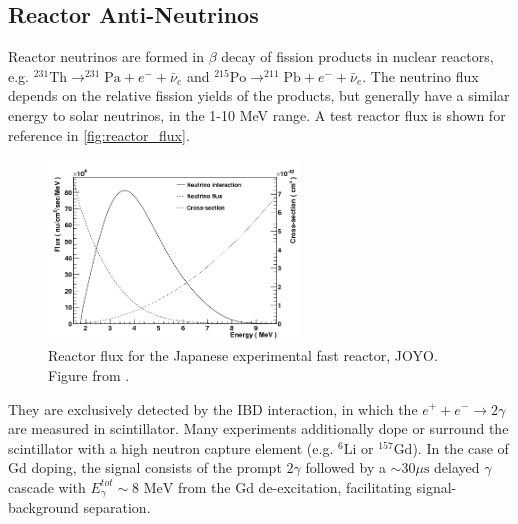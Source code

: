 \subsection{Reactor Anti-Neutrinos}
Reactor neutrinos are formed in $\beta$ decay of fission products in nuclear reactors, e.g. $^{231}\text{Th} \rightarrow ^{231}\text{Pa} + e^- + \bar{\nu}_e$ and $^{215}\text{Po} \rightarrow ^{211}\text{Pb} + e^- + \bar{\nu}_e$. The neutrino flux depends on the relative fission yields of the products, but generally have a similar energy to solar neutrinos, in the 1-10 MeV range. A test reactor flux is shown for reference in \autoref{fig:reactor_flux}.
\begin{figure}[h]
	\includegraphics[width=0.6\textwidth, trim={0mm 0mm 0mm 0mm}, clip,page=1]{figures/theory/reactor_flux}
	\caption{Reactor flux for the Japanese experimental fast reactor, JOYO. Figure from \cite{reactor_flux}.}
	\label{fig:reactor_flux}
\end{figure}

They are exclusively detected by the IBD interaction, in which the $e^+ + e^- \rightarrow 2\gamma$ are measured in scintillator. Many experiments additionally dope or surround the scintillator with a high neutron capture element (e.g. $^{6}\text{Li}$ or $^{157}\text{Gd}$). In the case of Gd doping, the signal consists of the prompt $2\gamma$ followed by a $\sim30\mu\text{s}$ delayed $\gamma$ cascade with $E_\gamma^{tot}\sim8\text{ MeV}$ from the Gd de-excitation, facilitating signal-background separation. 

